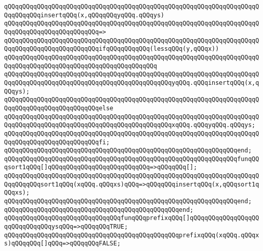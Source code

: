 \newline
\verb|qQQqqQQqqQQqqQQqqQQqqQQqqQQqqQQqqQQqqQQqqQQqqQQqqQQqqQQqqQQqqQQqqQQqqQQqqQQqqQQqinsertqQQq(x,qQQqqQQqyqQQq.qQQqys)|\newline
\verb|qQQqqQQqqQQqqQQqqQQqqQQqqQQqqQQqqQQqqQQqqQQqqQQqqQQqqQQqqQQqqQQqqQQqqQQqqQQqqQQqqQQqqQQqqQQqqQQq=>|\newline
\verb|qQQqqQQqqQQqqQQqqQQqqQQqqQQqqQQqqQQqqQQqqQQqqQQqqQQqqQQqqQQqqQQqqQQqqQQqqQQqqQQqqQQqqQQqqQQqqQQqifqQQqqQQqqQQq(lessqQQq(y,qQQqx))|\newline
\verb|qQQqqQQqqQQqqQQqqQQqqQQqqQQqqQQqqQQqqQQqqQQqqQQqqQQqqQQqqQQqqQQqqQQqqQQqqQQqqQQqqQQqqQQqqQQqqQQqqQQqqQQqqQQqqQQq|\newline
\verb|qQQqqQQqqQQqqQQqqQQqqQQqqQQqqQQqqQQqqQQqqQQqqQQqqQQqqQQqqQQqqQQqqQQqqQQqqQQqqQQqqQQqqQQqqQQqqQQqqQQqqQQqqQQqqQQqqQQqyqQQq.qQQqinsertqQQq(x,qQQqys);|\newline
\verb|qQQqqQQqqQQqqQQqqQQqqQQqqQQqqQQqqQQqqQQqqQQqqQQqqQQqqQQqqQQqqQQqqQQqqQQqqQQqqQQqqQQqqQQqqQQqqQQqelse|\newline
\verb|qQQqqQQqqQQqqQQqqQQqqQQqqQQqqQQqqQQqqQQqqQQqqQQqqQQqqQQqqQQqqQQqqQQqqQQqqQQqqQQqqQQqqQQqqQQqqQQqqQQqqQQqqQQqqQQqqQQqxqQQq.qQQqyqQQq.qQQqys;|\newline
\verb|qQQqqQQqqQQqqQQqqQQqqQQqqQQqqQQqqQQqqQQqqQQqqQQqqQQqqQQqqQQqqQQqqQQqqQQqqQQqqQQqqQQqqQQqqQQqqQQqfi;|\newline
\verb|qQQqqQQqqQQqqQQqqQQqqQQqqQQqqQQqqQQqqQQqqQQqqQQqqQQqqQQqqQQqqQQqend;|\newline
\newline
\verb|qQQqqQQqqQQqqQQqqQQqqQQqqQQqqQQqqQQqqQQqqQQqqQQqqQQqqQQqqQQqqQQqfunqQQqsort1qQQq[]qQQqqQQqqQQqqQQqqQQqqQQqqQQq=>qQQqqQQq[];|\newline
\verb|qQQqqQQqqQQqqQQqqQQqqQQqqQQqqQQqqQQqqQQqqQQqqQQqqQQqqQQqqQQqqQQqqQQqqQQqqQQqqQQqsort1qQQq(xqQQq.qQQqxs)qQQq=>qQQqqQQqinsertqQQq(x,qQQqsort1qQQqxs);|\newline
\verb|qQQqqQQqqQQqqQQqqQQqqQQqqQQqqQQqqQQqqQQqqQQqqQQqqQQqqQQqqQQqqQQqend;|\newline
\verb|qQQqqQQqqQQqqQQqqQQqqQQqqQQqqQQqqQQqqQQqqQQqqQQqend;|\newline
\newline
\verb|qQQqqQQqqQQqqQQqqQQqqQQqqQQqqQQqfunqQQqprefixqQQq[]qQQqqQQqqQQqqQQqqQQqqQQqqQQqqQQqysqQQq=>qQQqqQQqTRUE;|\newline
\verb|qQQqqQQqqQQqqQQqqQQqqQQqqQQqqQQqqQQqqQQqqQQqqQQqprefixqQQq(xqQQq.qQQqxs)qQQqqQQq[]qQQq=>qQQqqQQqFALSE;|\newline
\newline
